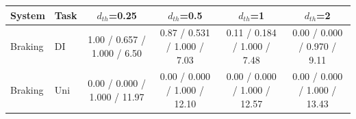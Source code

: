 \begin{tabular}{llcccc}
\hline
System & Task & $d_{th}$=0.25 & $d_{th}$=0.5 & $d_{th}$=1 & $d_{th}$=2 \\
\hline
Braking & DI & 1.00 / 0.657 / 1.000 / 6.50 & 0.87 / 0.531 / 1.000 / 7.03 & 0.11 / 0.184 / 1.000 / 7.48 & 0.00 / 0.000 / 0.970 / 9.11 \\
Braking & Uni & 0.00 / 0.000 / 1.000 / 11.97 & 0.00 / 0.000 / 1.000 / 12.10 & 0.00 / 0.000 / 1.000 / 12.57 & 0.00 / 0.000 / 1.000 / 13.43 \\
\hline
\end{tabular}
